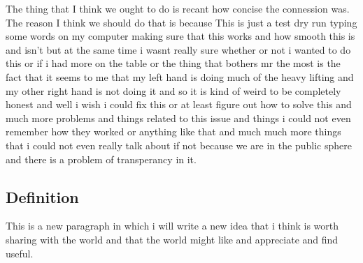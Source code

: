 \documentclass[a4paper, oneside, 10pt]{article}
\begin{document}
			The thing that I think we ought to do is recant how concise the connession was. The reason I think we should do that is because This is just a test dry run typing some words on my computer making sure that this works and how smooth this is and isn't but at the same time i wasnt really sure whether or not i wanted to do this or if i had more on the table or the thing that bothers mr the most is the fact that it seems to me that my left hand is doing much of the heavy lifting and my other right hand is not doing it and so it is kind of weird to be completely honest and well i wish i could fix this or at least figure out how to solve this and much more problems and things related to this issue and things i could not even remember how they worked or anything like that and much much more things that i could not even really talk about if not because we are in the public sphere and there is a problem of transperancy in it.

		\subsection{Definition} %

			This is a new paragraph in which i will write a new idea that i think is worth sharing with the world and that the world might like and appreciate and find useful.

\end{document}
